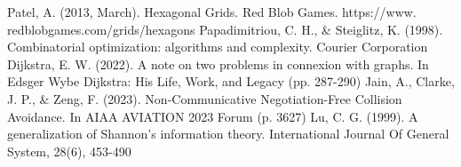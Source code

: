 \documentclass[conference, letter]{IEEEtran}
\begin{document}
\begin{thebibliography}{00}
 Patel, A. (2013, March). Hexagonal Grids. Red Blob Games. https://www. redblobgames.com/grids/hexagons
Papadimitriou, C. H., \& Steiglitz, K. (1998). Combinatorial optimization: algorithms and complexity. Courier Corporation
Dijkstra, E. W. (2022). A note on two problems in connexion with graphs. In Edsger Wybe Dijkstra: His Life, Work, and Legacy (pp. 287-290)
Jain, A., Clarke, J. P., \& Zeng, F. (2023). Non-Communicative Negotiation-Free Collision Avoidance. In AIAA AVIATION 2023 Forum (p. 3627)
Lu, C. G. (1999). A generalization of Shannon's information theory. International Journal Of General System, 28(6), 453-490



\end{thebibliography}
\end{document}
